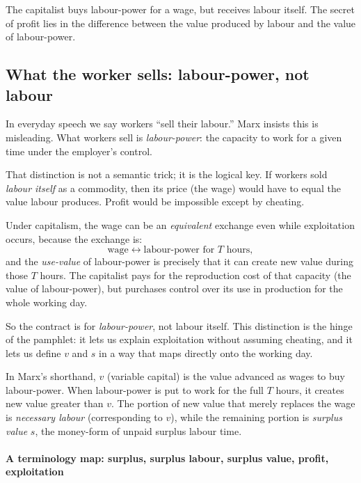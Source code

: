 The capitalist buys labour-power for a wage, but receives labour itself. The
secret of profit lies in the difference between the value produced by labour
and the value of labour-power.

\subsection{What the worker sells: labour-power, not labour}
\label{sec:labourpower-not-labour}

In everyday speech we say workers ``sell their labour.'' Marx insists this is
misleading. What workers sell is \emph{labour-power}: the capacity to work for a
given time under the employer’s control.

That distinction is not a semantic trick; it is the logical key. If workers sold
\emph{labour itself} as a commodity, then its price (the wage) would have to equal
the value labour produces. Profit would be impossible except by cheating.

Under capitalism, the wage can be an \emph{equivalent} exchange even while exploitation
occurs, because the exchange is:
\[
  \text{wage} \longleftrightarrow \text{labour-power for } T \text{ hours},
\]
and the \emph{use-value} of labour-power is precisely that it can create new value
during those $T$ hours. The capitalist pays for the reproduction cost of that capacity
(the value of labour-power), but purchases control over its use in production for the
whole working day.

So the contract is for \emph{labour-power}, not labour itself. This distinction is the
hinge of the pamphlet: it lets us explain exploitation without assuming cheating, and it
lets us define $v$ and $s$ in a way that maps directly onto the working day.

In Marx’s shorthand, $v$ (variable capital) is the value advanced as wages to buy
labour-power. When labour-power is put to work for the full $T$ hours, it creates new
value greater than $v$. The portion of new value that merely replaces the wage is
\emph{necessary labour} (corresponding to $v$), while the remaining portion is
\emph{surplus value} $s$, the money-form of unpaid surplus labour time.

\paragraph{A terminology map: surplus, surplus labour, surplus value, profit, exploitation}
\label{sec:terms-surplus-profit}

